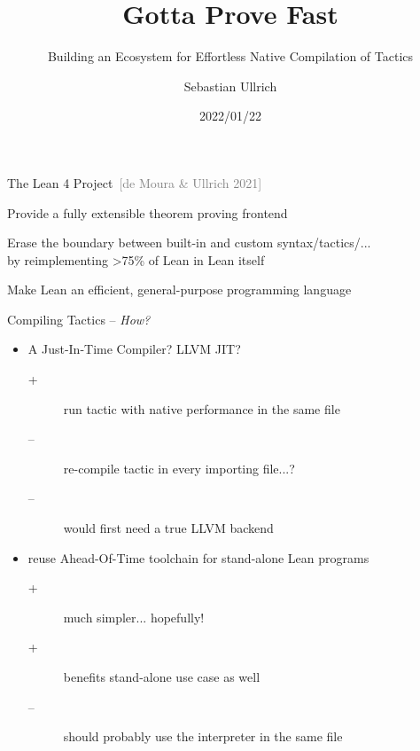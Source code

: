 \documentclass[en,t,navbarkit]{sdqbeamer}
\title{Gotta Prove Fast}
\subtitle{Building an Ecosystem for Effortless Native Compilation of Tactics}
\author{Sebastian Ullrich}
\date{2022/01/22}
\begin{document}
\KITtitleframe

\begin{frame}{The Lean 4 Project~\textcolor{gray}{\small[de Moura \& Ullrich 2021]\nocite{demoura2021lean}}}
  \begin{centering}
    \vfill

  Provide a fully extensible theorem proving frontend

  \vfill

  Erase the boundary between built-in and custom syntax/tactics/...
  \\
  by reimplementing >75\% of Lean in Lean itself

  \vfill

  Make Lean an efficient, general-purpose programming language

  \vfill
  \end{centering}
\end{frame}


\begin{frame}{Compiling Tactics -- \emph{How?}}
  \pause
  \begin{itemize}
    \item A Just-In-Time Compiler? LLVM JIT?
          \begin{description}
            \item[+] run tactic with native performance in the same file
            \item[--] re-compile tactic in every importing file...?
            \item[--] would first need a true LLVM backend
          \end{description}
          \pause
          \vfill
    \item reuse Ahead-Of-Time toolchain for stand-alone Lean programs
          \begin{description}
            \item[+] much simpler... hopefully!
            \item[+] benefits stand-alone use case as well
            \item[--] should probably use the interpreter in the same file
          \end{description}
  \end{itemize}
\end{frame}
\end{document}
